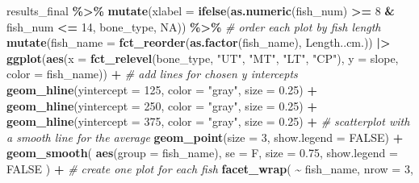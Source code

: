 \documentclass[
]{article}
\newenvironment{Shaded}{\begin{snugshade}}{\end{snugshade}}
\newcommand{\AttributeTok}[1]{\textcolor[rgb]{0.13,0.29,0.53}{#1}}
\newcommand{\CommentTok}[1]{\textcolor[rgb]{0.56,0.35,0.01}{\textit{#1}}}
\newcommand{\ConstantTok}[1]{\textcolor[rgb]{0.56,0.35,0.01}{#1}}
\newcommand{\DecValTok}[1]{\textcolor[rgb]{0.00,0.00,0.81}{#1}}
\newcommand{\FloatTok}[1]{\textcolor[rgb]{0.00,0.00,0.81}{#1}}
\newcommand{\FunctionTok}[1]{\textcolor[rgb]{0.13,0.29,0.53}{\textbf{#1}}}
\newcommand{\NormalTok}[1]{#1}
\newcommand{\SpecialCharTok}[1]{\textcolor[rgb]{0.81,0.36,0.00}{\textbf{#1}}}
\newcommand{\StringTok}[1]{\textcolor[rgb]{0.31,0.60,0.02}{#1}}
\begin{document}
\begin{Shaded}
\begin{Highlighting}[]
\NormalTok{results\_final }\SpecialCharTok{\%\textgreater{}\%} 
  \FunctionTok{mutate}\NormalTok{(}\AttributeTok{xlabel =} \FunctionTok{ifelse}\NormalTok{(}\FunctionTok{as.numeric}\NormalTok{(fish\_num) }\SpecialCharTok{\textgreater{}=} \DecValTok{8} \SpecialCharTok{\&}\NormalTok{ fish\_num }\SpecialCharTok{\textless{}=} \DecValTok{14}\NormalTok{, bone\_type, }\ConstantTok{NA}\NormalTok{)) }\SpecialCharTok{\%\textgreater{}\%} 
  \CommentTok{\# order each plot by fish length}
  \FunctionTok{mutate}\NormalTok{(}\AttributeTok{fish\_name =} \FunctionTok{fct\_reorder}\NormalTok{(}\FunctionTok{as.factor}\NormalTok{(fish\_name), Length..cm.)) }\SpecialCharTok{|\textgreater{}}
\FunctionTok{ggplot}\NormalTok{(}\FunctionTok{aes}\NormalTok{(}\AttributeTok{x =} \FunctionTok{fct\_relevel}\NormalTok{(bone\_type, }\StringTok{"UT"}\NormalTok{, }\StringTok{"MT"}\NormalTok{, }\StringTok{"LT"}\NormalTok{, }\StringTok{"CP"}\NormalTok{), }\AttributeTok{y =}\NormalTok{ slope, }\AttributeTok{color =}\NormalTok{ fish\_name)) }\SpecialCharTok{+}
  \CommentTok{\# add lines for chosen y intercepts}
  \FunctionTok{geom\_hline}\NormalTok{(}\AttributeTok{yintercept =} \DecValTok{125}\NormalTok{, }\AttributeTok{color =} \StringTok{"gray"}\NormalTok{, }\AttributeTok{size =} \FloatTok{0.25}\NormalTok{) }\SpecialCharTok{+} 
  \FunctionTok{geom\_hline}\NormalTok{(}\AttributeTok{yintercept =} \DecValTok{250}\NormalTok{, }\AttributeTok{color =} \StringTok{"gray"}\NormalTok{, }\AttributeTok{size =} \FloatTok{0.25}\NormalTok{) }\SpecialCharTok{+} 
  \FunctionTok{geom\_hline}\NormalTok{(}\AttributeTok{yintercept =} \DecValTok{375}\NormalTok{, }\AttributeTok{color =} \StringTok{"gray"}\NormalTok{, }\AttributeTok{size =} \FloatTok{0.25}\NormalTok{) }\SpecialCharTok{+} 
  \CommentTok{\# scatterplot with a smooth line for the average}
  \FunctionTok{geom\_point}\NormalTok{(}\AttributeTok{size =} \DecValTok{3}\NormalTok{, }\AttributeTok{show.legend =} \ConstantTok{FALSE}\NormalTok{) }\SpecialCharTok{+}
  \FunctionTok{geom\_smooth}\NormalTok{(}
    \FunctionTok{aes}\NormalTok{(}\AttributeTok{group =}\NormalTok{ fish\_name),}
    \AttributeTok{se =}\NormalTok{ F,}
    \AttributeTok{size =} \FloatTok{0.75}\NormalTok{,}
    \AttributeTok{show.legend =} \ConstantTok{FALSE}
\NormalTok{  ) }\SpecialCharTok{+}
  \CommentTok{\# create one plot for each fish}
  \FunctionTok{facet\_wrap}\NormalTok{( }\SpecialCharTok{\textasciitilde{}}\NormalTok{ fish\_name,}
              \AttributeTok{nrow =} \DecValTok{3}\NormalTok{,}

\end{Highlighting}
\end{Shaded}
\end{document}
